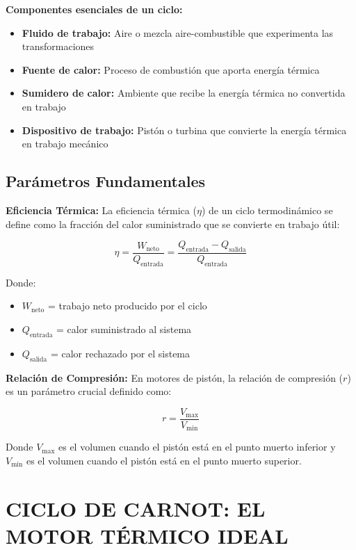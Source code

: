 \documentclass{article}
\begin{document}
\textbf{Componentes esenciales de un ciclo:}
\begin{itemize}
    \item \textbf{Fluido de trabajo:} Aire o mezcla aire-combustible que experimenta las transformaciones
    \item \textbf{Fuente de calor:} Proceso de combustión que aporta energía térmica
    \item \textbf{Sumidero de calor:} Ambiente que recibe la energía térmica no convertida en trabajo
    \item \textbf{Dispositivo de trabajo:} Pistón o turbina que convierte la energía térmica en trabajo mecánico
\end{itemize}

\subsection*{Parámetros Fundamentales}

\textbf{Eficiencia Térmica:}
La eficiencia térmica ($\eta$) de un ciclo termodinámico se define como la fracción del calor suministrado que se convierte en trabajo útil:

$$\eta = \frac{W_{\text{neto}}}{Q_{\text{entrada}}} = \frac{Q_{\text{entrada}} - Q_{\text{salida}}}{Q_{\text{entrada}}}$$

Donde:
\begin{itemize}
    \item $W_{\text{neto}}$ = trabajo neto producido por el ciclo
    \item $Q_{\text{entrada}}$ = calor suministrado al sistema
    \item $Q_{\text{salida}}$ = calor rechazado por el sistema
\end{itemize}

\textbf{Relación de Compresión:}
En motores de pistón, la relación de compresión ($r$) es un parámetro crucial definido como:

$$r = \frac{V_{\text{max}}}{V_{\text{min}}}$$

Donde $V_{\text{max}}$ es el volumen cuando el pistón está en el punto muerto inferior y $V_{\text{min}}$ es el volumen cuando el pistón está en el punto muerto superior.

\vspace{5mm}

\section*{CICLO DE CARNOT: EL MOTOR TÉRMICO IDEAL}
\end{document}
